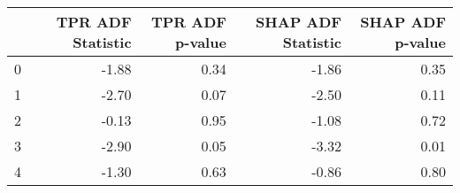 \begin{tabular}{lrrrr}
\toprule
 & TPR ADF Statistic & TPR ADF p-value & SHAP ADF Statistic & SHAP ADF p-value \\
\midrule
0 & -1.88 & 0.34 & -1.86 & 0.35 \\
1 & -2.70 & 0.07 & -2.50 & 0.11 \\
2 & -0.13 & 0.95 & -1.08 & 0.72 \\
3 & -2.90 & 0.05 & -3.32 & 0.01 \\
4 & -1.30 & 0.63 & -0.86 & 0.80 \\
\bottomrule
\end{tabular}
